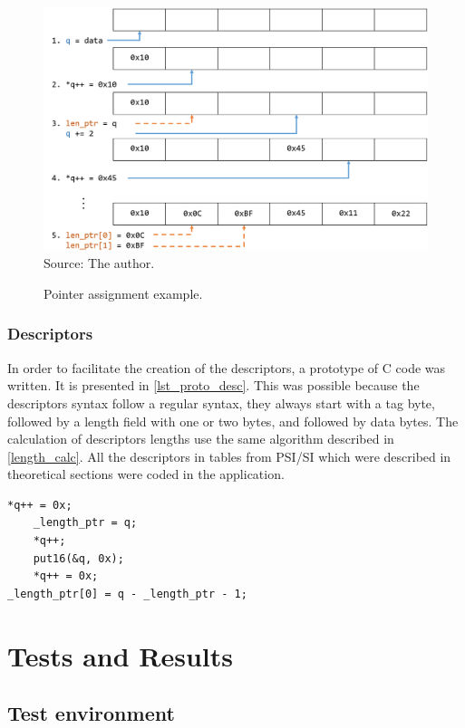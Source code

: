 \documentclass[
	12pt,				%
	openright,			%
	twoside,			%
	a4paper,			%
	brazil,
	french,				%
	english
	]{abntex2}
\begin{document}
\begin{figure}[!h]
\centering
\caption{Pointer assignment example.}
\includegraphics[width=0.8\linewidth]{figuras/pointer_assignment.png}
\\Source: The author.
\label{fig:pointer_assignment}
\end{figure}

\subsection{Descriptors}

In order to facilitate the creation of the descriptors, a prototype of C code was written. It is presented in \autoref{lst_proto_desc}. This was possible because the descriptors syntax follow a regular syntax, they always start with a tag byte, followed by a length field with one or two bytes, and followed by data bytes. The calculation of descriptors lengths use the same algorithm described in \autoref{length_calc}. All the descriptors in tables from PSI/SI which were described in theoretical sections were coded in the application.

\begin{lstlisting}[caption={Descriptors prototype.}, label={lst_proto_desc}]
	*q++ = 0x;
	_length_ptr = q;
	*q++;
	put16(&q, 0x);
	*q++ = 0x; 
_length_ptr[0] = q - _length_ptr - 1;
\end{lstlisting}

\chapter{Tests and Results}
%
\section{Test environment}
\end{document}
